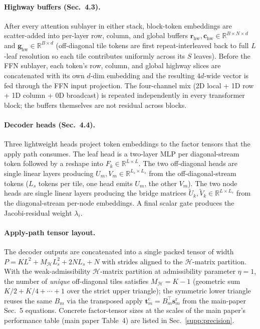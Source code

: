 \documentclass[acmtog]{acmart}
\begin{document}
\paragraph{Highway buffers (Sec.~4.3).}
After every attention sublayer in either stack, block-token embeddings are
scatter-added into per-layer row, column, and global buffers
$\mathbf{r}_{\mathrm{hw}}, \mathbf{c}_{\mathrm{hw}}\!\in\!\mathbb{R}^{B\times N\times d}$
and $\mathbf{g}_{\mathrm{hw}}\!\in\!\mathbb{R}^{B\times d}$ (off-diagonal tile
tokens are first repeat-interleaved back to full $L$-leaf resolution so each tile
contributes uniformly across its $S$ leaves). Before the FFN sublayer, each
token's row, column, and global highway slices are concatenated with its own
$d$-dim embedding and the resulting $4d$-wide vector is fed through the FFN input
projection. The four-channel mix (2D local + 1D row + 1D column + 0D broadcast)
is repeated independently in every transformer block; the buffers themselves are
not residual across blocks.

\paragraph{Decoder heads (Sec.~4.4).}
Three lightweight heads project token embeddings to the factor tensors that the
apply path consumes. The leaf head is a two-layer MLP per diagonal-stream token
followed by a reshape into $F_k\!\in\!\mathbb{R}^{L\times L}$. The two
off-diagonal heads are single linear layers producing
$U_m, V_m\!\in\!\mathbb{R}^{L_s\times L_s}$ from the off-diagonal-stream tokens
($L_s$ tokens per tile, one head emits $U_m$, the other $V_m$). The two node
heads are single linear layers producing the bridge matrices
$\tilde U_k, \tilde V_k\!\in\!\mathbb{R}^{L\times L_s}$ from the diagonal-stream
per-node embeddings. A final scalar gate produces the Jacobi-residual weight
$\lambda_i$.

\paragraph{Apply-path tensor layout.}
The decoder outputs are concatenated into a single packed tensor of width
$P\!=\!KL^2 + M_{\mathcal{H}} L_s^2 + 2NL_s + N$ with strides aligned to the
$\mathcal{H}$-matrix partition. With the weak-admissibility $\mathcal{H}$-matrix partition at
admissibility parameter $\eta\!=\!1$, the number of \emph{unique} off-diagonal
tiles satisfies $M_{\mathcal{H}}\!=\!K\!-\!1$ (geometric sum
$K/2 + K/4 + \cdots + 1$ over the strict upper triangle); the symmetric lower
triangle reuses the same $B_m$ via the transposed apply
$\mathbf{t}^{\mathrm{c}}_m\!=\!B_m^\top\mathbf{s}^{\mathrm{r}}_m$ from the
main-paper Sec.~5 equations. Concrete factor-tensor sizes at the scales of the main paper's
performance table (main paper Table~4) are listed in Sec.~\ref{supp:precision}.
\end{document}
